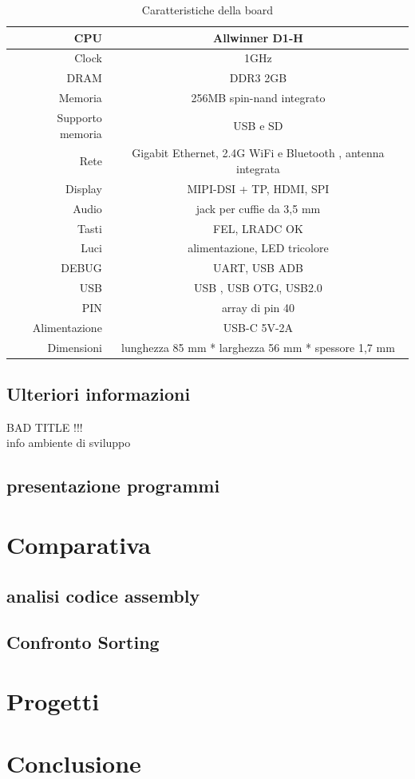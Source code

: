 \documentclass[12pt,a4paper]{report}
\begin{document}
\vspace{2cm}
\begin{table}
\centering
\begin{tabular}{|r|c|}
\hline
CPU & Allwinner D1-H \\
\hline
Clock & 1GHz\\
\hline
DRAM & DDR3 2GB\\
\hline
Memoria & 256MB  spin-nand integrato\\
\hline 
Supporto memoria & USB e  SD\\
\hline
Rete & Gigabit Ethernet,  2.4G WiFi e Bluetooth , antenna integrata\\
\hline
Display & MIPI-DSI + TP, HDMI, SPI \\
\hline
Audio & jack per cuffie da 3,5 mm\\
\hline
Tasti & FEL, LRADC OK\\
\hline
Luci &  alimentazione, LED tricolore\\
\hline
DEBUG & UART, USB ADB\\
\hline
USB & USB , USB OTG, USB2.0\\
\hline
PIN & array di pin 40\\
\hline
Alimentazione & USB-C  5V-2A\\
\hline
Dimensioni & lunghezza 85 mm * larghezza 56 mm * spessore 1,7 mm\\
\hline

\end{tabular}
\caption{Caratteristiche della board}
\end{table}

\section{Ulteriori informazioni}
BAD TITLE !!!\\
info ambiente di sviluppo
\section{presentazione programmi}

\chapter{Comparativa}
\section{analisi codice assembly}
\section{Confronto Sorting}

\chapter{Progetti }

\chapter{Conclusione}


\printbibliography
\end{document}

